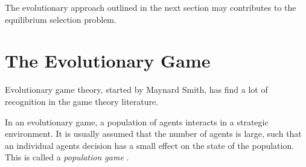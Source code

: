 \documentclass[12pt]{article}
\begin{document}
The evolutionary approach outlined in the next section may contributes to 
the equilibrium selection problem. 

\section{The Evolutionary Game}
\label{evolutionarysection}
Evolutionary game theory, started by Maynard Smith, has find a lot of 
recognition in the game theory literature. 

In an evolutionary game, a population of agents interacts in a 
strategic environment. It is usually assumed that the number of agents is 
large, such that an individual agents decision has a small effect on the
state of the population. This is called a \textit{population game} \cite{sandholm_population_2010}.
\end{document}
